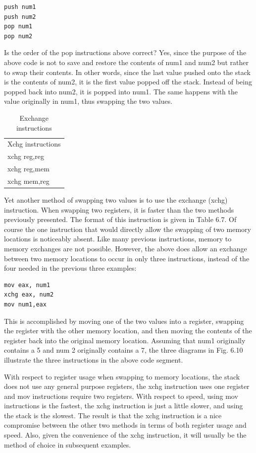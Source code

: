 \documentclass[10pt]{book}
\begin{document}
\begin{verbatim}
push num1
push num2
pop num1
pop num2
\end{verbatim}

Is the order of the pop instructions above correct? Yes, since the purpose of the above code is not to save and restore the contents of num1 and num2 but rather to swap their contents. In other words, since the last value pushed onto the stack is the contents of num2, it is the first value popped off the stack. Instead of being popped back into num2, it is popped into num1. The same happens with the value originally in num1, thus swapping the two values.

\begin{table}[h]
\centering
\begin{tabular}{l}
Xchg instructions \\
xchg reg,reg \\
xchg reg,mem \\
xchg mem,reg
\end{tabular}
\caption{Exchange instructions}
\end{table}

Yet another method of swapping two values is to use the exchange (xchg) instruction. When swapping two registers, it is faster than the two methods previously presented. The format of this instruction is given in Table 6.7.
Of course the one instruction that would directly allow the swapping of two memory locations is noticeably absent. Like many previous instructions, memory to memory exchanges are not possible. However, the above does allow an exchange between two memory locations to occur in only three instructions, instead of the four needed in the previous three examples:

\begin{verbatim}
mov eax, num1
xchg eax, num2
mov num1,eax
\end{verbatim}

This is accomplished by moving one of the two values into a register, swapping the register with the other memory location, and then moving the contents of the register back into the original memory location. Assuming that num1 originally contains a 5 and num 2 originally contains a 7, the three diagrams in Fig. 6.10 illustrate the three instructions in the above code segment.

With respect to register usage when swapping to memory locations, the stack does not use any general purpose registers, the xchg instruction uses one register and mov instructions require two registers. With respect to speed, using mov instructions is the fastest, the xchg instruction is just a little slower, and using the stack is the slowest. The result is that the xchg instruction is a nice compromise between the other two methods in terms of both register usage and speed. Also, given the convenience of the xchg instruction, it will usually be the method of choice in subsequent examples.
\end{document}
